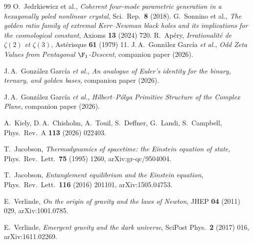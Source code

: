 \begin{thebibliography}{99}
 O.~Jedrkiewicz et al., \emph{Coherent four-mode parametric generation in a hexagonally poled nonlinear crystal}, Sci.\ Rep.\ \textbf{8} (2018).
 G.~Sonnino et al., \emph{The golden ratio family of extremal Kerr--Newman black holes and its implications for the cosmological constant}, Axioms \textbf{13} (2024) 720.
 R.~Ap\'ery, \emph{Irrationalit\'e de $\zeta(2)$ et $\zeta(3)$}, Ast\'erisque \textbf{61} (1979) 11.
 J.\,A.~Gonz\'alez Garc\'ia \emph{et al.},
  \emph{Odd Zeta Values from Pentagonal $\F_1$-Descent}, companion paper (2026).

 J.\,A.~Gonz\'alez Garc\'ia \emph{et al.},
  \emph{An analogue of Euler's identity for the binary, ternary, and golden bases}, companion paper (2026).

 J.\,A.~Gonz\'alez Garc\'ia \emph{et al.},
  \emph{Hilbert--P\'olya Primitive Structure of the Complex Plane}, companion paper (2026).

 A.~Kiely, D.\,A.~Chisholm, A.~Touil, S.~Deffner, G.~Landi, S.~Campbell,
  Phys.\ Rev.\ A \textbf{113} (2026) 022403.

 T.~Jacobson,
  \emph{Thermodynamics of spacetime: the Einstein equation of state},
  Phys.\ Rev.\ Lett.\ \textbf{75} (1995) 1260, arXiv:gr-qc/9504004.

 T.~Jacobson,
  \emph{Entanglement equilibrium and the Einstein equation},
  Phys.\ Rev.\ Lett.\ \textbf{116} (2016) 201101, arXiv:1505.04753.

 E.~Verlinde,
  \emph{On the origin of gravity and the laws of Newton},
  JHEP \textbf{04} (2011) 029, arXiv:1001.0785.

 E.~Verlinde,
  \emph{Emergent gravity and the dark universe},
  SciPost Phys.\ \textbf{2} (2017) 016, arXiv:1611.02269.


\end{thebibliography}
